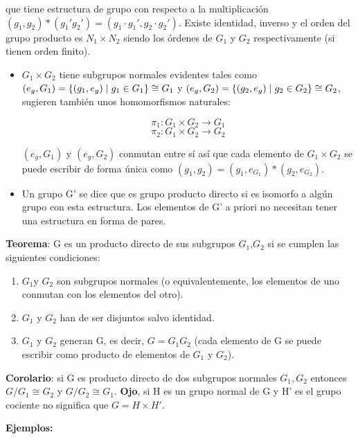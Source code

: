 \documentclass{article}
\begin{document}
que tiene estructura de grupo con respecto a la multiplicación $(g_1,g_2)*(g_1'g_2')=(g_1\cdot g_1',g_2\cdot g_2')$. Existe identidad, inverso y el orden del grupo producto es $N_1\times N_2$ siendo los órdenes de $G_1$ y $G_2$ respectivamente (si tienen orden finito).

\begin{itemize}
\item $G_1 \times G_2$ tiene subgrupos normales evidentes tales como $(e_g,G_1)=\lbrace (g_1,e_g) \hspace{0.1cm} | \hspace{0.1cm}g_1 \in G_1 \rbrace \cong G_1$ y $(e_g,G_2)=\lbrace (g_2,e_g) \hspace{0.1cm} | \hspace{0.1cm}g_2 \in G_2 \rbrace \cong G_2$, sugieren también unos homomorfismos naturales:

$$\pi _1: G_1\times G_2 \to G_1$$
$$\pi _2 : G_1\times G_2 \to G_2$$

$(e_g,G_1)$ y $(e_g,G_2)$ conmutan entre sí así que cada elemento de $G_1 \times G_2$ se puede escribir de forma única como $(g_1,g_2)=(g_1,e_{G_1})*(g_2,e_{G_2})$.
\item Un grupo G' se dice que es grupo producto directo si es isomorfo a algún grupo con esta estructura. Los elementos de G' a priori no necesitan tener una estructura en forma de pares.

\end{itemize}

\textbf{Teorema}: G es un producto directo de sus subgrupos $G_1$,$G_2$ si se cumplen las siguientes condiciones:

\begin{enumerate}
\item $G_1$y $G_2$ son subgrupos normales (o equivalentemente, los elementos de uno conmutan con los elementos del otro).
\item $G_1$ y $G_2$ han de ser disjuntos salvo identidad.
\item $G_1$ y $G_2$ generan G, es decir, $G=G_1G_2$ (cada elemento de G se puede escribir como producto de elementos de $G_1$ y $G_2$).
\end{enumerate}

\textbf{Corolario}: si G es producto directo de dos subgrupos normales $G_1,G_2$ entonces $G/G_1 \cong G_2$ y $G/G_2 \cong G_1$. \textbf{Ojo}, si H es un grupo normal de G y H' es el grupo cociente no significa que $G=H\times H'$.

\bigskip
\textbf{Ejemplos:}
\end{document}
